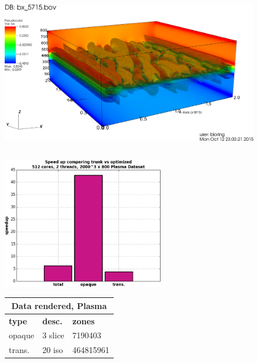 \documentclass[a4paper,10pt]{report}
\begin{document}
\begin{figure}[ht]
\centering
\includegraphics[height=3.0in]{./vpic_test_case_0030.png}
\begin{minipage}[c]{0.46\textwidth}
\begin{center}
\includegraphics[height=2.25in]{./speed_up_vpic.png} 
\end{center}
\end{minipage}
\begin{minipage}{0.5\textwidth}
{\footnotesize
\def\arraystretch{1.25}
\begin{tabular}{|l|l|l|}
\hline
\multicolumn{3}{|c|}{\bf{Data rendered, Plasma}} \\ \hline
{\bf type} & {\bf desc.} & {\bf zones} \\ \hline
opaque & 3 slice &  7190403 \\ \hline
trans. & 20 iso & 464815961 \\ \hline
\end{tabular}}%
\end{minipage}
\end{figure}
\end{document}
